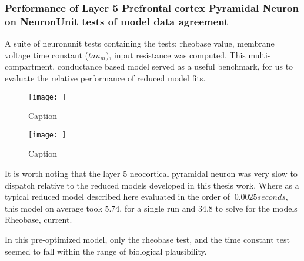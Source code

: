 \subsubsection{Performance of Layer 5 Prefrontal cortex Pyramidal Neuron on NeuronUnit tests of model data agreement}

A suite of neuronunit tests containing the tests: rheobase value, membrane voltage time constant ($tau_{m})$, input resistance was computed. This multi-compartment, conductance based model served as a useful benchmark, for us to evaluate the relative performance of reduced model fits.

\begin{figure}
    \centering
    \texttt{[image: ]}
    \caption{Caption}
    \label{fig:my_label}
\end{figure}


\begin{figure}
    \centering
    \texttt{[image: ]}
    \caption{Caption}
    \label{fig:my_label}
\end{figure}
    

It is worth noting that the layer 5 neocortical pyramidal neuron was very slow to dispatch relative to the reduced models developed in this thesis work. Where as a typical reduced model described here evaluated in the order of $~0.0025 seconds$, this model on average took $5.74$, for a single run and $34.8$ to solve for the models Rheobase, current.

\begin{table}[ht]
\centering
{}
\end{table}

In this pre-optimized model, only the rheobase test, and the time constant test seemed to fall within the range of biological plausibility.